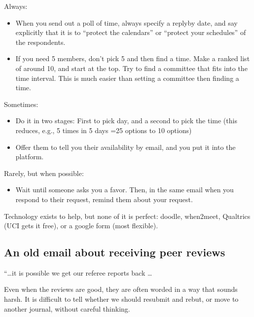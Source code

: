 \documentclass[letterpaper,10pt,english]{sphinxmanual}
\begin{document}
\sphinxAtStartPar
Always:
\begin{itemize}
\item {} 
\sphinxAtStartPar
When you send out a poll of time, always specify a reply\sphinxhyphen{}by date, and say explicitly that it is to “protect the calendars” or “protect your schedules” of the respondents.

\item {} 
\sphinxAtStartPar
If you need 5 members, don’t pick 5 and then find a time. Make a ranked list of around 10, and start at the top. Try to find a committee that fits into the time interval. This is much easier than setting a committee then finding a time.

\end{itemize}

\sphinxAtStartPar
Sometimes:
\begin{itemize}
\item {} 
\sphinxAtStartPar
Do it in two stages: First to pick day, and a second to pick the time (this reduces, e.g., 5 times in 5 days =25 options to 10 options)

\item {} 
\sphinxAtStartPar
Offer them to tell you their availability by e\sphinxhyphen{}mail, and you put it into the platform.

\end{itemize}

\sphinxAtStartPar
Rarely, but when possible:
\begin{itemize}
\item {} 
\sphinxAtStartPar
Wait until someone asks you a favor. Then, in the same e\sphinxhyphen{}mail when you respond to their request, remind them about your request.

\end{itemize}

\sphinxAtStartPar
Technology exists to help, but none of it is perfect: doodle, when2meet, Qualtrics (UCI gets it free), or a google form (most flexible).


\subsection{An old e\sphinxhyphen{}mail about receiving peer reviews}
\label{\detokenize{OldEmails:an-old-e-mail-about-receiving-peer-reviews}}\label{\detokenize{OldEmails:receiving-reviews}}
\sphinxAtStartPar
“…it is possible we get our referee reports back …

\sphinxAtStartPar
Even when the reviews are good, they are often worded in a way that sounds harsh. It is difficult to tell whether we should resubmit and rebut, or move to another journal, without careful thinking.
\end{document}
